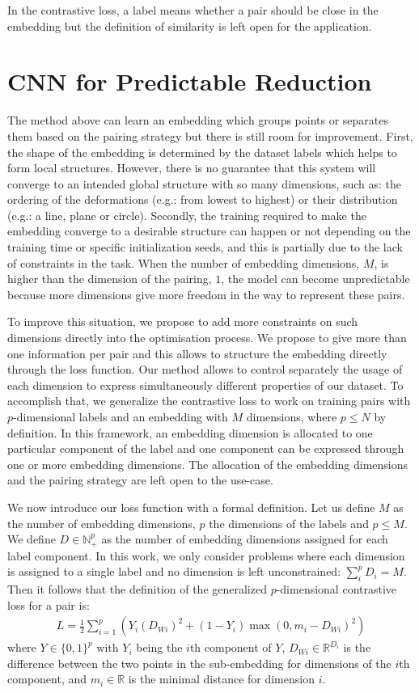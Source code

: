 \documentclass[a4paper,12pt]{report}
\newcommand{\N}{\mathbb{N}}
\newcommand{\R}{\mathbb{R}}
\newcommand{\eg}{e.g.}
\begin{document}
In the contrastive loss, a label means whether a pair should be close in the embedding but the definition of similarity is left open for the application.

\section{CNN for Predictable Reduction}
The method above can learn an embedding which groups points or separates them based on the pairing strategy but there is still room for improvement.
First, the shape of the embedding is determined by the dataset labels which helps to form local structures.
However, there is no guarantee that this system will converge to an intended global structure with so many dimensions, such as: the ordering of the deformations (\eg: from lowest to highest) or their distribution (\eg: a line, plane or circle).
Secondly, the training required to make the embedding converge to a desirable structure can happen or not depending on the training time or specific initialization seeds, and this is partially due to the lack of constraints in the task.
When the number of embedding dimensions, $M$, is higher than the dimension of the pairing, $1$, the model can become unpredictable because more dimensions give more freedom in the way to represent these pairs.

To improve this situation, we propose to add more constraints on such dimensions directly into the optimisation process.
We propose to give more than one information per pair and this allows to structure the embedding directly through the loss function.
Our method allows to control separately the usage of each dimension to express simultaneously different properties of our dataset.
To accomplish that, we generalize the contrastive loss to work on training pairs with $p$-dimensional labels and an embedding with $M$ dimensions, where $p \leq N$ by definition.
In this framework, an embedding dimension is allocated to one particular component of the label and one component can be expressed through one or more embedding dimensions.
The allocation of the embedding dimensions and the pairing strategy are left open to the use-case.

We now introduce our loss function with a formal definition.
Let us define $M$ as the number of embedding dimensions, $p$ the dimensions of the labels and $p \leq M$.
We define $D \in \N_+^p$ as the number of embedding dimensions assigned for each label component.
In this work, we only consider problems where each dimension is assigned to a single label and no dimension is left unconstrained: $\sum_i^p D_i = M$.
Then it follows that the definition of the generalized $p$-dimensional contrastive loss for a pair is:
\begin{eqnarray}
    L = \frac{1}{2} \sum_{i=1}^p \left( Y_i (D_{Wi})^2 + (1-Y_i) \max(0, m_i - D_{Wi})^2 \right)
\end{eqnarray}
where $Y \in \{0,1\}^p$ with $Y_i$ being the $i$th component of $Y$, $D_{Wi} \in \R^{D_i}$ is the difference between the two points in the sub-embedding for dimensions of the $i$th component, and $m_i \in \R$ is the minimal distance for dimension $i$.
\end{document}
